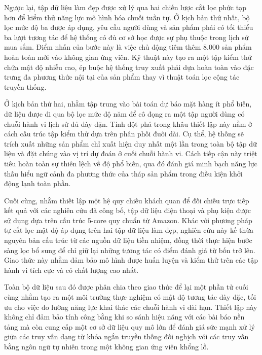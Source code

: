 Ngược lại, tập dữ liệu làm đẹp được xử lý qua hai chiến lược cắt lọc phức tạp hơn để kiểm thử năng lực mô hình hóa chuỗi tuần tự. Ở kịch bản thứ nhất, bộ lọc mức độ ba được áp dụng, yêu cầu người dùng và sản phẩm phải có tối thiểu ba lượt tương tác để hệ thống có đủ cơ sở học được sự phụ thuộc trong lịch sử mua sắm. Điểm nhấn của bước này là việc chủ động tiêm thêm 8.000 sản phẩm hoàn toàn mới vào không gian ứng viên. Kỹ thuật này tạo ra một tập kiểm thử chứa mật độ nhiễu cao, ép buộc hệ thống truy xuất phải dựa hoàn toàn vào đặc trưng đa phương thức nội tại của sản phẩm thay vì thuật toán lọc cộng tác truyền thống.

Ở kịch bản thứ hai, nhằm tập trung vào bài toán dự báo mặt hàng ít phổ biến, dữ liệu được đi qua bộ lọc mức độ năm để cô đọng ra một tập người dùng có chuỗi hành vi lịch sử đủ dày dặn. Tính đột phá trong khâu thiết lập này nằm ở cách cấu trúc tập kiểm thử dựa trên phân phối đuôi dài. Cụ thể, hệ thống sẽ trích xuất những sản phẩm chỉ xuất hiện duy nhất một lần trong toàn bộ tập dữ liệu và đặt chúng vào vị trí dự đoán ở cuối chuỗi hành vi. Cách tiếp cận này triệt tiêu hoàn toàn sự thiên lệch về độ phổ biến, qua đó đánh giá minh bạch năng lực thấu hiểu ngữ cảnh đa phương thức của tháp sản phẩm trong điều kiện khởi động lạnh toàn phần.

Cuối cùng, nhằm thiết lập một hệ quy chiếu khách quan để đối chiếu trực tiếp kết quả với các nghiên cứu đã công bố, tập dữ liệu điện thoại và phụ kiện được sử dụng dựa trên cấu trúc 5-core quy chuẩn từ Amazon. Khác với phương pháp tự cắt lọc mật độ áp dụng trên hai tập dữ liệu làm đẹp, nghiên cứu này kế thừa nguyên bản cấu trúc từ các nguồn dữ liệu tiền nhiệm, đồng thời thực hiện bước sàng lọc bổ sung để chỉ giữ lại những tương tác có điểm đánh giá từ bốn trở lên. Giao thức này nhằm đảm bảo mô hình được huấn luyện và kiểm thử trên các tập hành vi tích cực và có chất lượng cao nhất. 

Toàn bộ dữ liệu sau đó được phân chia theo giao thức để lại một phần tử cuối cùng nhằm tạo ra một môi trường thực nghiệm có mật độ tương tác dày đặc, tối ưu cho việc đo lường năng lực khai thác các chuỗi hành vi dài hạn. Thiết lập này không chỉ đảm bảo tính công bằng khi so sánh hiệu năng với các bài báo nền tảng mà còn cung cấp một cơ sở dữ liệu quy mô lớn để đánh giá sức mạnh xử lý giữa các truy vấn dạng từ khóa ngắn truyền thống đối nghịch với các truy vấn bằng ngôn ngữ tự nhiên trong một không gian ứng viên khổng lồ.

